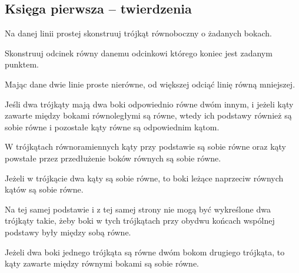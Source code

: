 \subsection{Księga pierwsza -- twierdzenia}
\setcounter{counter_euclid}{0}

\begin{euclid_theorem}
    Na danej linii prostej skonstruuj trójkąt równoboczny o żadanych bokach.
\end{euclid_theorem}

\begin{euclid_theorem}
    Skonstruuj odcinek równy danemu odcinkowi którego koniec jest zadanym punktem.
\end{euclid_theorem}

\begin{euclid_theorem}
    Mając dane dwie linie proste nierówne, od większej odciąć linię równą mniejszej.
\end{euclid_theorem}

\begin{euclid_theorem}
    Jeśli dwa trójkąty mają dwa boki odpowiednio równe dwóm innym, i jeżeli kąty zawarte między bokami równoległymi są równe, wtedy ich podstawy również są sobie równe i pozostałe kąty równe są odpowiednim kątom.
\end{euclid_theorem}

\begin{euclid_theorem}
    W trójkątach równoramiennych kąty przy podstawie są sobie równe oraz kąty powstałe przez przedłużenie boków równych są sobie równe.
\end{euclid_theorem}

\begin{euclid_theorem}
    Jeżeli w trójkącie dwa kąty są sobie równe, to boki leżące naprzeciw równych kątów są sobie równe.
\end{euclid_theorem}

\begin{euclid_theorem}
    Na tej samej podstawie i z tej samej strony nie mogą być wykreślone dwa trójkąty takie, żeby boki w tych trójkątach przy obydwu końcach wspólnej podstawy były między sobą równe.
\end{euclid_theorem}

\begin{euclid_theorem}
    Jeżeli dwa boki jednego trójkąta są równe dwóm bokom drugiego trójkąta, to kąty zawarte między równymi bokami są sobie równe.
\end{euclid_theorem}

